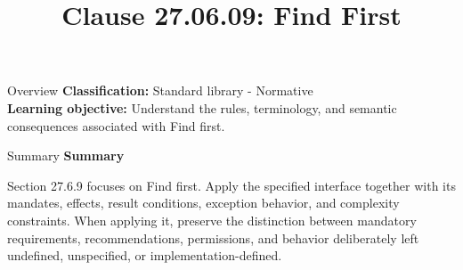 \documentclass[10pt,letterpaper]{article}
\title{Clause 27.06.09: Find First}
\author{}
\date{}
\begin{document}
\maketitle
\begin{CornellOverviewBox}{Overview}
\textbf{Classification:} Standard library - Normative\\[2pt]
\textbf{Learning objective:} Understand the rules, terminology, and semantic consequences associated with Find first.
\end{CornellOverviewBox}\begin{CornellSummaryBox}{Summary}
{\sffamily\bfseries\color{Accent} Summary}\par\vspace{3pt}Section 27.6.9 focuses on Find first. Apply the specified interface together with its mandates, effects, result conditions, exception behavior, and complexity constraints. When applying it, preserve the distinction between mandatory requirements, recommendations, permissions, and behavior deliberately left undefined, unspecified, or implementation-defined.
\end{CornellSummaryBox}
\end{document}
